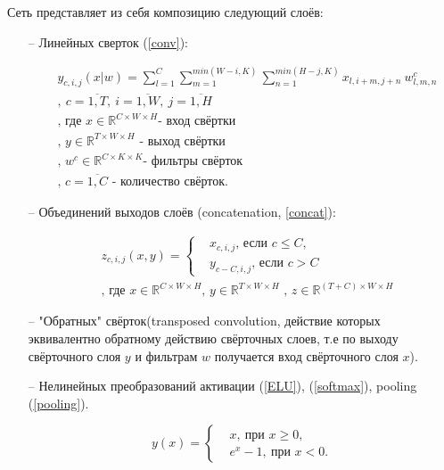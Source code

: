 \documentclass[12pt, a4paper]{extarticle}
\begin{document}
Сеть представляет из себя композицию следующий слоёв: 
\begin{itemize}
	\item[--] Линейных сверток (\ref{conv}):
	
\begin{equation} \label{conv}
\begin{aligned}
	& y_{c, i, j}(x|w) = \sum \limits_{l=1}^{C} 
		\sum \limits_{m=1}^{min(W - i, K)}
		\sum \limits_{n=1}^{min(H - j, K)} 
		x_{l, i + m, j + n} \ w^c_{l, m, n} \\
	& ,\ c = \overline{1, T} 
		,\ i = \overline{1, W}
		,\ j = \overline{1, H} \\
	& \text{, где $x \in \mathbb{R}^{C \times W \times H}$
		- вход свёртки} \\
	& \text{, $y \in \mathbb{R}^{T \times W \times H}$ 
		- выход свёртки} \\
	& \text{, $w^c \in \mathbb{R}^{C \times K \times K}$
		- фильтры свёрток} \\
	& \text{, $c=\overline{1, C}$ - количество свёрток}.
\end{aligned}
\end{equation}

 	\item[--] Объединений выходов слоёв (concatenation, \ref{concat}):
 
\begin{equation} \label{concat}
\begin{aligned}
	& z_{c, i, j}(x, y) = \begin{cases}
		& x_{c, i, j} \text{, если $c \leq C$,} \\
		& y_{c - C, i, j} \text{, если $c > C$}
	\end{cases} \\
	& \text{, где $x \in \mathbb{R}^{C \times W \times H}$
	,\ $y \in \mathbb{R}^{T \times W \times H}$ 
	,\ $z \in \mathbb{R}^{(T + C) \times W \times H}$}
\end{aligned}
\end{equation}

 	\item[--] "Обратных" свёрток(transposed convolution, действие которых эквивалентно обратному действию свёрточных слоев, т.е по выходу свёрточного слоя $y$ и фильтрам $w$ получается вход свёрточного слоя $x$).
 	
 	\item[--] Нелинейных преобразований
активации (\ref{ELU}), (\ref{softmax}), pooling (\ref{pooling}).

\begin{equation} \label{ELU}
	y(x) = \begin{cases} 
		& x ,\ \text{при $x \geq 0$}, \\	
		& e^x - 1 ,\ \text{при $x < 0$}.
	\end{cases}
\end{equation}


\end{itemize}
\end{document}
